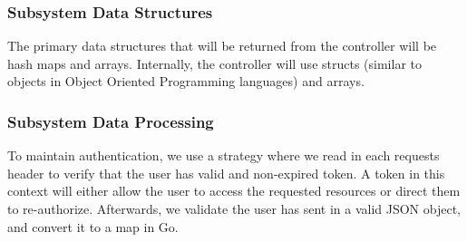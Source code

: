 \subsubsection{Subsystem Data Structures}
The primary data structures that will be returned from the controller will be hash maps and arrays. Internally, the controller will use structs (similar to objects in Object Oriented Programming languages) and arrays.

\subsubsection{Subsystem Data Processing}
To maintain authentication, we use a strategy where we read in each requests header to verify that the user has valid and non-expired token. A token in this context will either allow the user to access the requested resources or direct them to re-authorize. Afterwards, we validate the user has sent in a valid JSON object, and convert it to a map in Go.

\newpage
